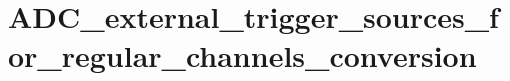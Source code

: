 \hypertarget{group___a_d_c__external__trigger__sources__for__regular__channels__conversion}{\section{A\-D\-C\-\_\-external\-\_\-trigger\-\_\-sources\-\_\-for\-\_\-regular\-\_\-channels\-\_\-conversion}
\label{group___a_d_c__external__trigger__sources__for__regular__channels__conversion}
}
